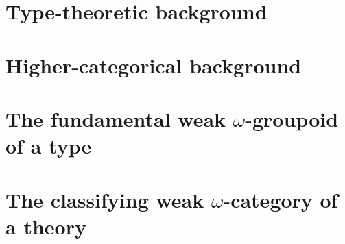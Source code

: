 \documentclass[11pt]{amsbook}
\begin{document}
%
%



\mainmatter

\chapter{Type-theoretic background}



\chapter{Higher-categorical background}



\chapter{The fundamental weak $\omega$-groupoid of a type}



\chapter{The classifying weak $\omega$-category of a theory}


















\clearpage







\backmatter




\end{document}
